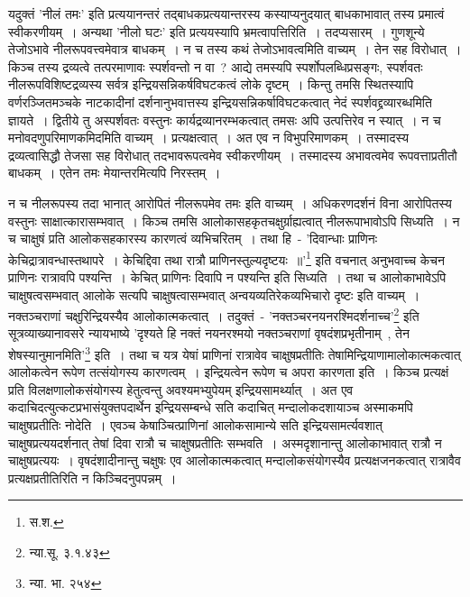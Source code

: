 		यदुक्तं 'नीलं तमः' इति प्रत्ययानन्तरं तद्बाधकप्रत्ययान्तरस्य कस्याप्यनुदयात् बाधकाभावात् तस्य प्रमात्वं स्वीकरणीयम्~। अन्यथा 'नीलो घटः' इति प्रत्ययस्यापि भ्रमत्वापत्तिरिति~। तदप्यसारम्~। गुणशून्ये तेजोऽभावे नीलरूपवत्त्वमेवात्र बाधकम्~। न च तस्य कथं तेजोऽभावत्वमिति वाच्यम्~। तेन सह विरोधात्~। किञ्च तस्य द्रव्यत्वे तत्परमाणावः स्पर्शवन्तो न वा~? आद्ये तमस्यपि स्पर्शोपलब्धिप्रसङ्गः, स्पर्शवतः नीलरूपविशिष्टद्रव्यस्य सर्वत्र इन्द्रियसन्निकर्षविघटकत्वं लोके दृष्टम्~। किन्तु तमसि स्थितस्यापि वर्णरञ्जितमञ्चके नाटकादीनां दर्शनानुभवात्तस्य इन्द्रियसन्निकर्षाविघटकत्वात् नेदं स्पर्शवद्द्रव्यारब्धमिति ज्ञायते~। द्वितीये तु अस्पर्शवतः वस्तुनः कार्यद्रव्यानरम्भकत्वात् तमसः अपि उत्पत्तिरेव न स्यात्~। न च मनोवदणुपरिमाणकमिदमिति वाच्यम्~। प्रत्यक्षत्वात्~। अत एव न विभुपरिमाणकम्~। तस्मादस्य द्रव्यत्वासिद्धौ तेजसा सह विरोधात् तदभावरूपत्वमेव स्वीकरणीयम्~। तस्मादस्य अभावत्वमेव रूपवत्ताप्रतीतौ बाधकम्~। एतेन तमः मेयान्तरमित्यपि निरस्तम्~।

		न च नीलरूपस्य तदा भानात् आरोपितं नीलरूपमेव तमः इति वाच्यम्~। अधिकरणदर्शनं विना आरोपितस्य वस्तुनः साक्षात्कारासम्भवात्~। किञ्च तमसि आलोकासहकृतचक्षुर्ग्राह्यत्वात् नीलरूपाभावोऽपि सिध्यति~। न च चाक्षुषं प्रति आलोकसहकारस्य कारणत्वं व्यभिचरितम्~। तथा हि~- {\fontsize{11.7}{0}\selectfont\s 'दिवान्धाः प्राणिनः केचिद्रात्रावन्धास्तथापरे~। केचिद्दिवा तथा रात्रौ प्राणिनस्तुल्यदृष्टयः~॥'\footnote{स.श.}} इति वचनात् अनुभवाच्च केचन प्राणिनः रात्रावपि पश्यन्ति~। केचित् प्राणिनः दिवापि न पश्यन्ति इति सिध्यति~। तथा च आलोकाभावेऽपि चाक्षुषत्वसम्भवात् आलोके सत्यपि चाक्षुषत्वासम्भवात् अन्वयव्यतिरेकव्यभिचारो दृष्टः इति वाच्यम्~। नक्तञ्चराणां चक्षुरिन्द्रियस्यैव आलोकात्मकत्वात्~। तदुक्तं~- 'नक्तञ्चरनयनरश्मिदर्शनाच्च'\footnote{न्या.सू. ३.१.४३} इति सूत्रव्याख्यानावसरे न्यायभाष्ये {\fontsize{11.7}{0}\selectfont\s 'दृश्यते हि नक्तं नयनरश्मयो नक्तञ्चराणां वृषदंशप्रभृतीनाम्~, तेन शेषस्यानुमानमिति'\footnote{न्या. भा. २५४}} इति~। तथा च यत्र येषां प्राणिनां रात्रावेव चाक्षुषप्रतीतिः तेषामिन्द्रियाणामालोकात्मकत्वात् आलोकत्वेन रूपेण तत्संयोगस्य कारणत्वम्~। इन्द्रियत्वेन रूपेण च अपरा कारणता इति~। किञ्च प्रत्यक्षं प्रति विलक्षणालोकसंयोगस्य हेतुत्वन्तु अवश्यमभ्युपेयम् इन्द्रियसामर्थ्यात्~। अत एव कदाचिदत्युत्कटप्रभासंयुक्तपदार्थेन इन्द्रियसम्बन्धे सति कदाचित् मन्दालोकदशायाञ्च अस्माकमपि चाक्षुषप्रतीतिः नोदेति~। एवञ्च केषाञ्चित्प्राणिनां आलोकसामान्ये सति इन्द्रियसामर्त्यवशात् चाक्षुषप्रत्ययदर्शनात् तेषां दिवा रात्रौ च चाक्षुषप्रतीतिः सम्भवति~। अस्मदृशानान्तु आलोकाभावात् रात्रौ न चाक्षुषप्रत्ययः~। वृषदंशादीनान्तु चक्षुषः एव आलोकात्मकत्वात् मन्दालोकसंयोगस्यैव प्रत्यक्षजनकत्वात् रात्रावैव प्रत्यक्षप्रतीतिरिति न किञ्चिदनुपपन्नम्~। 

